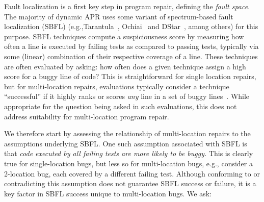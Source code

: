 \documentclass[10pt,journal,compsoc]{IEEEtran}
\begin{document}
Fault localization is a first key step in program repair, defining the
\emph{fault space}. The majority of dynamic APR
uses some variant of spectrum-based fault localization (SBFL) (e.g.,Tarantula~\cite{tarantula},
Ochiai~\cite{ochiai} and DStar~\cite{wong2013dstar}, among others) for this purpose.
%
SBFL techniques compute a suspiciousness score by
measuring how often a line is executed by failing tests as compared to passing
tests, typically via some (linear) combination of their respective
coverage of a line. 
These techniques are often evaluated by asking: how often does a given technique assign a high 
score for a buggy line of code? This is straightforward for single location repairs, but for 
multi-location repairs, evaluations
typically consider a technique ``successful'' if it highly ranks or scores \emph{any} line in a
set of buggy lines~\cite{zou2019empirical,pearson2017evaluating,golagha2020can}.
While appropriate for the question being asked in such evaluations, this does not address
suitability for multi-location program repair.%

We therefore start by assessing the 
relationship of multi-location repairs to the assumptions underlying SBFL. 
One such assumption associated with SBFL is that 
\emph{code executed by all failing tests are more likely to be buggy.}
This is clearly true for single-location bugs, but less so for 
multi-location bugs, e.g., consider a 2-location bug, each covered by a
different failing test. Although conforming to or contradicting this assumption does
not guarantee SBFL success or failure, 
it is a key factor in SBFL success unique to multi-location bugs.  We ask:
\end{document}
